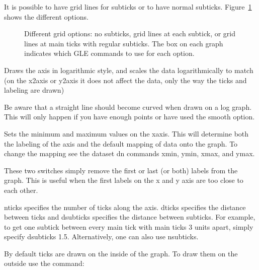 \begin{commanddescription}
It is possible to have grid lines for subticks or to have normal subticks. Figure~\ref{gridmode:fig} shows the different options.

\begin{figure}[tb]
\centering

\caption{\label{gridmode:fig}Different grid options: no subticks, grid lines at each subtick, or grid lines at main ticks with regular subticks. The box on each graph indicates which GLE commands to use for each option.}
\end{figure}

\item[{\sf xaxis log}  ]
Draws the axis in logarithmic style, and scales the data logarithmically
to match (on the x2axis or y2axis it does not affect the data, only the
way the ticks and labeling are drawn)

Be aware that a straight line should become curved
when drawn on a log graph.  This will only happen if you have
enough points or have used the {\sf smooth} option.

\item[{\sf xaxis min {\it low} max {\it high}} ]
Sets the minimum and maximum values on the xaxis.  This will determine both the
labeling of the axis and the default mapping of data onto the graph.
To change the mapping see the dataset {\sf dn} commands
{\sf xmin}, {\sf ymin}, {\sf xmax}, and {\sf ymax}.

\item[{\sf xaxis nofirst nolast}  ]
These two switches simply remove the first or last (or both) labels from
the graph.  This is useful when the first labels on
the x and y axis are too close to each other.

\item[{\sf xaxis nticks {\it number} dticks {\it distance} dsubticks {\it distance}} ]
{\sf nticks} specifies the number of ticks along the axis.  {\sf dticks}
specifies the distance between ticks and {\sf dsubticks}
specifies the distance between subticks.  For example, to get one subtick
between every main tick with main ticks 3 units apart, simply specify
{\sf dsubticks 1.5}. Alternatively, one can also use {\sf nsubticks}.

By default ticks are drawn on the inside of the graph.  To draw
them on the outside use the command:


\end{commanddescription}
